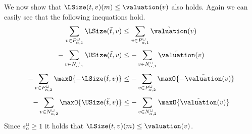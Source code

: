 We now show that $\LSize(t, v)(m) \leq \valuation(v)$ also holds.
Again we can easily see that the following inequations hold.
\[ \sum_{v \in P_{\alpha,1}^\sqcup} \LSize(\tilde{t}, v) \leq \sum_{v \in P_{\alpha,1}^\sqcup} \tilde{\valuation}(v) \]
\[ - \sum_{v \in N_{\alpha,1}^\sqcup} \USize(\tilde{t}, v) \leq - \sum_{v \in N_{\alpha,1}^\sqcup} \tilde{\valuation}(v) \]
\[ - \sum_{v \in P_{\alpha,2}^\sqcup} \maxO{-\LSize(\tilde{t}, v)} \leq - \sum_{v \in P_{\alpha,2}^\sqcup} \maxO{-\tilde{\valuation}(v)} \]
\[ - \sum_{v \in N_{\alpha,2}^\sqcup} \maxO{\USize(\tilde{t}, v)} \leq - \sum_{v \in N_{\alpha,2}^\sqcup} \maxO{\tilde{\valuation}(v)} \]
Since $s^\sqcup_\alpha \geq 1$ it holds that $\LSize(t, v)(m) \leq \valuation(v)$.
